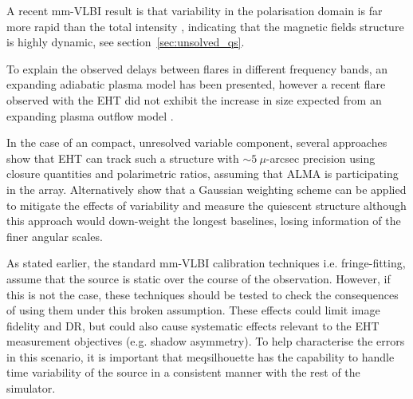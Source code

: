 A recent mm-VLBI result is that variability in the polarisation domain is far more rapid than the total intensity \citep{Johnson_2015b}, indicating that the magnetic fields structure is highly dynamic, see section~\ref{sec:unsolved_qs}.  



To explain the observed delays between flares in different frequency bands, an expanding adiabatic plasma model \citep[e.g.][]{Marrone_2008} has been presented, however a recent flare observed with the EHT did not exhibit the increase in size expected from an expanding plasma outflow model \cite{Fish_2011}.


In the case of an compact, unresolved variable component, several approaches \citep{Doeleman_2009, Fish_2009b, Johnson_2014} show that EHT can track such a structure with $\sim 5\ \mu$-arcsec precision using closure quantities and polarimetric ratios, assuming that ALMA is participating in the array. Alternatively \citet{Lu_2016} show that a Gaussian weighting scheme can be applied to mitigate the effects of variability and measure the quiescent structure although this approach would down-weight the longest baselines, losing information of the finer angular scales.

 

As stated earlier, the standard mm-VLBI calibration techniques i.e. fringe-fitting, assume that the source is static over the course of the observation. However, if this is not the case, these techniques should be tested to check the consequences of using them under this broken assumption. These effects could limit image fidelity and DR, but could also cause systematic effects relevant to the EHT measurement objectives (e.g. shadow asymmetry). To help characterise the errors in this scenario, it is important that {\sc meqsilhouette} has the capability to handle time variability of the source in a consistent manner with the rest of the simulator.


